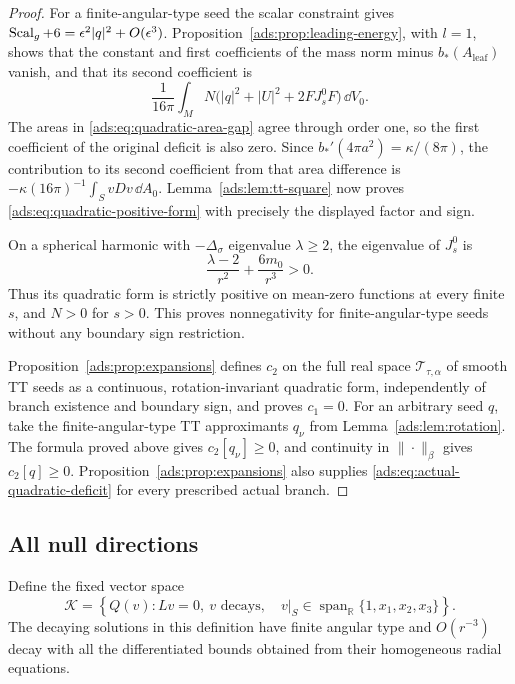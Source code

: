\begin{proof}
For a finite-angular-type seed the scalar constraint gives
$\operatorname{Scal}_g+6=\epsilon^2|q|^2+O(\epsilon^3)$.
Proposition~\ref{ads:prop:leading-energy}, with $l=1$, shows that the
constant and first coefficients of the mass norm minus
$b_*(A_{\mathrm{leaf}})$ vanish, and that its second coefficient is
\[
 \frac1{16\pi}\int_M N\bigl(|q|^2+|U|^2+2FJ_s^0F\bigr)\,\dd V_0.
\]
The areas in \eqref{ads:eq:quadratic-area-gap} agree through order one,
so the first coefficient of the original deficit is also zero.
Since $b_*'(4\pi a^2)=\kappa/(8\pi)$, the contribution to its second
coefficient from that area difference is
$-\kappa(16\pi)^{-1}\int_SvDv\,\dd A_0$.
Lemma~\ref{ads:lem:tt-square} now proves
\eqref{ads:eq:quadratic-positive-form} with precisely the displayed factor
and sign.

On a spherical harmonic with $-\Delta_\sigma$ eigenvalue $\lambda\geq2$,
the eigenvalue of $J_s^0$ is
\[
 \frac{\lambda-2}{r^2}+\frac{6m_0}{r^3}>0.
\]
Thus its quadratic form is strictly positive on mean-zero functions at
every finite $s$, and $N>0$ for $s>0$.
This proves nonnegativity for finite-angular-type seeds without any
boundary sign restriction.

Proposition~\ref{ads:prop:expansions} defines \(c_2\) on the full real
space \(\mathscr T_{\tau,\alpha}\) of smooth TT seeds as a continuous,
rotation-invariant quadratic form, independently of branch existence
and boundary sign, and proves \(c_1=0\). For an arbitrary seed \(q\),
take the finite-angular-type TT approximants \(q_\nu\) from
Lemma~\ref{ads:lem:rotation}. The formula proved above gives
\(c_2[q_\nu]\geq0\), and continuity in \(\|\cdot\|_\beta\) gives
\(c_2[q]\geq0\). Proposition~\ref{ads:prop:expansions} also supplies
\eqref{ads:eq:actual-quadratic-deficit} for every prescribed actual branch.
\end{proof}

\subsection{All null directions}

Define the fixed vector space
\begin{equation}
 \mathcal K=\left\{Q(v):Lv=0,\ v\text{ decays},\quad
 v|_S\in\operatorname{span}_{\mathbb R}\{1,x_1,x_2,x_3\}\right\}.
 \label{ads:eq:kernel-space}
\end{equation}
The decaying solutions in this definition have finite angular type and
$O(r^{-3})$ decay with all the differentiated bounds obtained from
their homogeneous radial equations.

